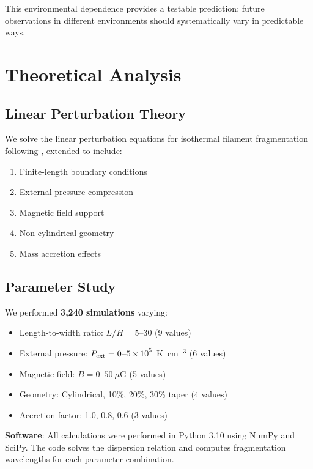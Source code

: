 \documentclass[11pt,a4paper]{article}
\begin{document}
This environmental dependence provides a testable prediction: future observations in different environments should systematically vary in predictable ways.

\section{Theoretical Analysis}

\subsection{Linear Perturbation Theory}

We solve the linear perturbation equations for isothermal filament fragmentation following \citet{Inutsuka1992}, extended to include:

\begin{enumerate}
    \item Finite-length boundary conditions \citep{Inutsuka1997}
    \item External pressure compression \citep{Fischera2012}
    \item Magnetic field support \citep{Hennebelle2013}
    \item Non-cylindrical geometry
    \item Mass accretion effects
\end{enumerate}

\subsection{Parameter Study}

We performed \textbf{3,240 simulations} varying:
\begin{itemize}
    \item Length-to-width ratio: $L/H = 5$--$30$ (9 values)
    \item External pressure: $P_{\rm ext} = 0$--$5 \times 10^5$~K~cm$^{-3}$ (6 values)
    \item Magnetic field: $B = 0$--$50~\mu$G (5 values)
    \item Geometry: Cylindrical, 10\%, 20\%, 30\% taper (4 values)
    \item Accretion factor: 1.0, 0.8, 0.6 (3 values)
\end{itemize}

\textbf{Software}: All calculations were performed in Python 3.10 using NumPy and SciPy. The code solves the dispersion relation and computes fragmentation wavelengths for each parameter combination.
\end{document}
